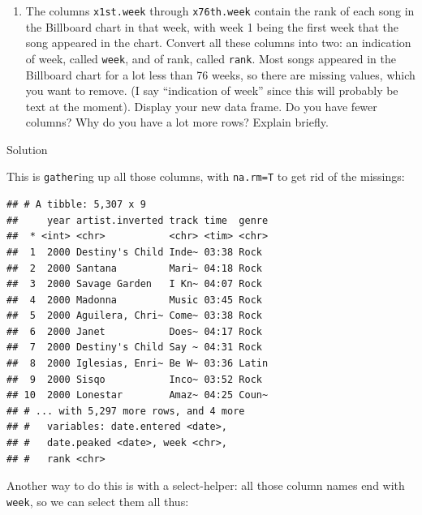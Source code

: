 \documentclass[]{tufte-book}
\newenvironment{Shaded}{}{}
\newcommand{\DataTypeTok}[1]{\textcolor[rgb]{0.56,0.13,0.00}{#1}}
\newcommand{\KeywordTok}[1]{\textcolor[rgb]{0.00,0.44,0.13}{\textbf{#1}}}
\newcommand{\NormalTok}[1]{#1}
\newcommand{\OperatorTok}[1]{\textcolor[rgb]{0.40,0.40,0.40}{#1}}
\newcommand{\StringTok}[1]{\textcolor[rgb]{0.25,0.44,0.63}{#1}}
\providecommand{\tightlist}{%
  \setlength{\itemsep}{0pt}\setlength{\parskip}{0pt}}
\theoremstyle{definition}
\theoremstyle{definition}
\theoremstyle{definition}
\theoremstyle{remark}
\begin{document}
\begin{enumerate}
\def\labelenumi{(\alph{enumi})}
\setcounter{enumi}{1}
\tightlist
\item
  The columns \texttt{x1st.week} through \texttt{x76th.week} contain the
  rank of each song in the Billboard chart in that week, with week 1
  being the first week that the song appeared in the chart. Convert all
  these columns into two: an indication of week, called \texttt{week},
  and of rank, called \texttt{rank}. Most songs appeared in the
  Billboard chart for a lot less than 76 weeks, so there are missing
  values, which you want to remove. (I say ``indication of week'' since
  this will probably be text at the moment). Display your new data
  frame. Do you have fewer columns? Why do you have a lot more rows?
  Explain briefly.
\end{enumerate}

Solution

This is \texttt{gather}ing up all those columns, with \texttt{na.rm=T}
to get rid of the missings:

\begin{Shaded}
\end{Shaded}

\begin{verbatim}
## # A tibble: 5,307 x 9
##     year artist.inverted track time  genre
##  * <int> <chr>           <chr> <tim> <chr>
##  1  2000 Destiny's Child Inde~ 03:38 Rock 
##  2  2000 Santana         Mari~ 04:18 Rock 
##  3  2000 Savage Garden   I Kn~ 04:07 Rock 
##  4  2000 Madonna         Music 03:45 Rock 
##  5  2000 Aguilera, Chri~ Come~ 03:38 Rock 
##  6  2000 Janet           Does~ 04:17 Rock 
##  7  2000 Destiny's Child Say ~ 04:31 Rock 
##  8  2000 Iglesias, Enri~ Be W~ 03:36 Latin
##  9  2000 Sisqo           Inco~ 03:52 Rock 
## 10  2000 Lonestar        Amaz~ 04:25 Coun~
## # ... with 5,297 more rows, and 4 more
## #   variables: date.entered <date>,
## #   date.peaked <date>, week <chr>,
## #   rank <chr>
\end{verbatim}

Another way to do this is with a select-helper: all those column names
end with \texttt{week}, so we can select them all thus:

\begin{Shaded}
\end{Shaded}
\end{document}
